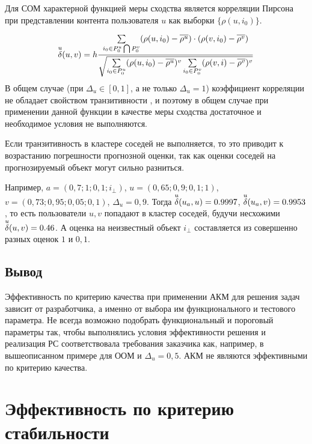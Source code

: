 Для СОМ характерной функцией меры сходства является корреляции Пирсона при
представлении контента пользователя $u$ как выборки
$\{\rho(u,i_0)\}$.

 \begin{equation}
  {\overset{u}{\mathcal{\delta}}}(u, v) =
h \frac{\sum \limits_{i_0 \in P^u_0 \bigcap P^v_0}
	(\rho(u,i_0) - \overline{\rho^u}) \cdot
	(\rho(v,i_0) - \overline{\rho^v})}
	{\sqrt{\sum \limits_{i_0 \in P^u_0}(\rho(u,i_0) -
	\overline{\rho^u})^v \sum \limits_{i_0 \in
	P^v_0}(\rho(v,i) - \overline{\rho^v})^v}}
\end{equation}
В общем случае (при $\Delta_u \in [0,1]$, а не только $\Delta_u = 1$)
коэффициент корреляции не обладает свойством транзитивности
\cite{pearson-trans}, и поэтому в общем случае при применении
данной функции в качестве меры сходства достаточное и необходимое условия не
выполняются.

Если транзитивность в кластере соседей не выполняется, то это приводит
к возрастанию погрешности прогнозной оценки,
так как оценки соседей на прогнозируемый объект могут сильно разниться.

Например, $a = (0,7; 1; 0,1; i_{\bot})$, $u = (0,65; 0,9; 0,1; 1)$,
$v = (0,73; 0,95; 0,05; 0,1)$, $\Delta_u = 0,9$.
Тогда ${\overset{u}{\mathcal{\delta}}}(u_a, u) = 0.9997$, ${\overset{u}{\mathcal{\delta}}}(u_a, v) = 0.9953$, то есть пользователи
$u, v$ попадают в кластер соседей, будучи несхожими
${\overset{u}{\mathcal{\delta}}}(u, v) = 0.46$. А оценка на неизвестный объект $i_{\bot}$ составляется
из совершенно разных оценок $1$ и $0,1$.
\subsection{Вывод}
Эффективность по критерию качества при применении АКМ для решения задач
зависит от разработчика, а именно от выбора им функционального и тестового
параметра. Не всегда возможно подобрать
функциональный и пороговый параметры так, чтобы выполнялись условия
эффективности решения и реализация РС соответствовала требования
заказчика как, например, в вышеописанном примере для ООМ и $\Delta_u = 0,5$.
АКМ не являются эффективными по критерию качества.
\section{Эффективность по критерию стабильности}
